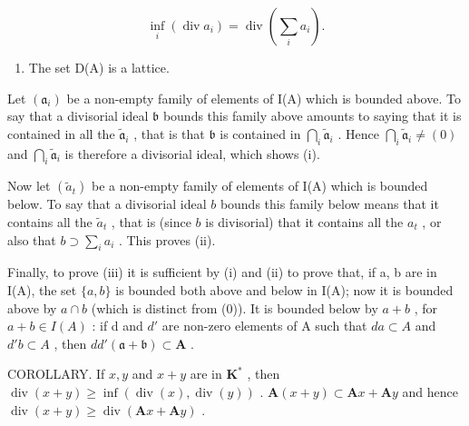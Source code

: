 \[
\inf _ {i} (\operatorname{div} a _ {i}) = \operatorname{div} \left(\sum_ {i} a _ {i}\right).
\]

\begin{enumerate}
\def\labelenumi{(\roman{enumi})}
\setcounter{enumi}{2}
\tightlist
\item
  The set D(A) is a lattice.
\end{enumerate}

Let \((\mathfrak{a}_i)\) be a non-empty family of elements of I(A) which is bounded above. To say that a divisorial ideal \(\mathfrak{b}\) bounds this family above amounts to saying that it is contained in all the \(\tilde{\mathfrak{a}}_i\) , that is that \(\mathfrak{b}\) is contained in \(\bigcap_{i} \tilde{\mathfrak{a}}_i\) . Hence \(\bigcap_{i} \tilde{\mathfrak{a}}_i \neq (0)\) and \(\bigcap_{i} \tilde{\mathfrak{a}}_i\) is therefore a divisorial ideal, which shows (i).

Now let \((\tilde{a}_t)\) be a non-empty family of elements of I(A) which is bounded below. To say that a divisorial ideal \(b\) bounds this family below means that it contains all the \(\tilde{a}_t\) , that is (since \(b\) is divisorial) that it contains all the \(a_t\) , or also that \(b \supset \sum_{i} a_i\) . This proves (ii).

Finally, to prove (iii) it is sufficient by (i) and (ii) to prove that, if a, b are in I(A), the set \(\{a, b\}\) is bounded both above and below in I(A); now it is bounded above by \(a \cap b\) (which is distinct from (0)). It is bounded below by \(a + b\) , for \(a + b \in I(A)\) : if d and \(d'\) are non-zero elements of A such that \(da \subset A\) and \(d'b \subset A\) , then \(dd'(\mathfrak{a} + \mathfrak{b}) \subset \mathbf{A}\) .

COROLLARY. If \(x, y\) and \(x + y\) are in \(\mathbf{K}^*\) , then \(\operatorname{div}(x + y) \geqslant \inf(\operatorname{div}(x), \operatorname{div}(y))\) . \(\mathbf{A}(x + y) \subset \mathbf{A}x + \mathbf{A}y\) and hence \(\operatorname{div}(x + y) \geqslant \operatorname{div}(\mathbf{A}x + \mathbf{A}y)\) .
\relax{}
